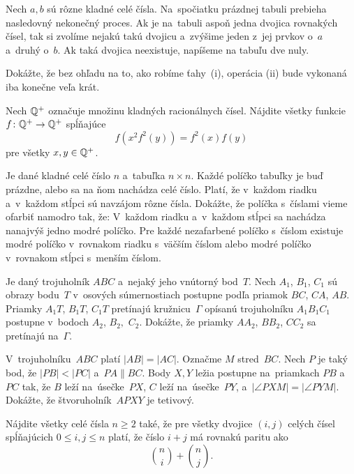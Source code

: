 {%
 Nech $a,b$ sú rôzne kladné celé čísla. Na~spočiatku prázdnej tabuli prebieha nasledovný nekonečný proces.
 Ak je na~tabuli aspoň jedna dvojica rovnakých čísel, tak si zvolíme nejakú takú dvojicu a~zvýšime jeden z~jej prvkov o~$a$ a~druhý o~$b$.
 Ak taká dvojica neexistuje, napíšeme na tabuľu dve nuly. 

Dokážte, že bez ohľadu na to, ako robíme ťahy~(i), operácia (ii) bude vykonaná iba konečne veľa krát.
}

{%
 Nech $\Bbb Q^{+}$ označuje množinu kladných racionálnych čísel. Nájdite všetky funkcie ${f\colon \Bbb Q^{+} \to \Bbb Q^{+}}$ spĺňajúce
$$
f\left(x^2f^2(y)\right)=f^2(x) f(y)
$$
pre všetky $x,y \in \Bbb Q^{+}$.
}

{%
 Je dané kladné celé číslo $n$ a~tabuľka $n \times n$. Každé políčko tabuľky je buď prázdne, alebo sa na ňom nachádza celé číslo. Platí, že v~každom riadku a~v~každom stĺpci sú navzájom rôzne čísla. Dokážte, že políčka s~číslami vieme ofarbiť namodro tak, že:
 V~každom riadku a~v~každom stĺpci sa nachádza nanajvýš jedno modré políčko.
 Pre každé nezafarbené políčko s~číslom existuje modré políčko v~rovnakom riadku s~väčším číslom alebo modré políčko v~rovnakom stĺpci s~menším číslom.\endgraf
}

{%
 Je daný trojuholník $ABC$ a~nejaký jeho vnútorný bod~$T$. Nech $A_1$, $B_1$, $C_1$ sú obrazy bodu~$T$ v~osových súmernostiach postupne podľa priamok $BC$, $CA$, $AB$. Priamky $A_1T$, $B_1T$, $C_1T$ pretínajú kružnicu~$\Gamma$ opísanú trojuholníku $A_1B_1C_1$ postupne v~bodoch $A_2$, $B_2,$ $C_2$. Dokážte, že priamky $AA_2$, $BB_2$, $CC_2$ sa pretínajú na~$\Gamma$.
}

{%
 V~trojuholníku~$ABC$ platí $|AB|=|AC|$. Označme $M$ stred~$BC$. Nech $P$ je taký bod, že $|PB|<|PC|$ a~$PA \parallel BC$. Body $X,Y$ ležia postupne na~priamkach $PB$ a~$PC$ tak, že $B$ leží na~úsečke~$PX$, $C$ leží na~úsečke~$PY$, a~$|\angle PXM|=|\angle PYM|$. Dokážte, že štvoruholník~$APXY$ je tetivový.
}

{%
 Nájdite všetky celé čísla $n \ge 2$ také, že pre všetky dvojice $(i,j)$ celých čísel spĺňajúcich $0 \leq i,j \leq n$ platí, že číslo $i+j$ má rovnakú paritu ako
$$
{n \choose i} + {n \choose j}.
$$
}

